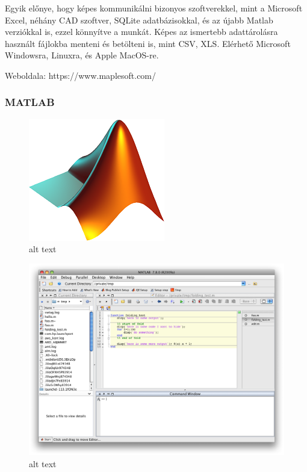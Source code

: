 Egyik előnye, hogy képes kommunikálni bizonyos szoftverekkel, mint a
Microsoft Excel, néhány CAD szoftver, SQLite adatbázisokkal, és az újabb
Matlab verziókkal is, ezzel könnyítve a munkát. Képes az ismertebb
adattárolásra használt fájlokba menteni és betölteni is, mint CSV, XLS.
Elérhető Microsoft Windowsra, Linuxra, és Apple MacOS-re.

Weboldala: https://www.maplesoft.com/

    \subsubsection{MATLAB}\label{matlab}

    \begin{figure}
\centering
\includegraphics{img/Matlab_Logo.png}
\caption{alt text}
\end{figure}

\begin{figure}
\centering
\includegraphics{img/matlab_sreenshots.png}
\caption{alt text}
\end{figure}

